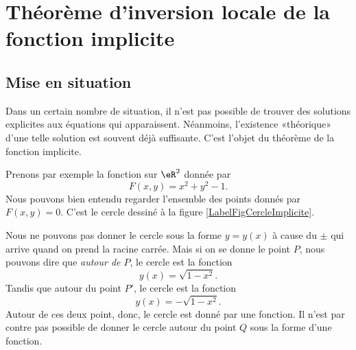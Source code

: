 					\section{Théorème d'inversion locale de la fonction implicite}

\subsection{Mise en situation}

Dans un certain nombre de situation, il n'est pas possible de trouver des solutions explicites aux équations qui apparaissent. Néanmoins, l'existence «théorique» d'une telle solution est souvent déjà suffisante. C'est l'objet du théorème de la fonction implicite.

Prenons par exemple la fonction sur $\eR^2$ donnée par 
\begin{equation}
	F(x,y)=x^2+y^2-1.
\end{equation}
Nous pouvons bien entendu regarder l'ensemble des points donnés par $F(x,y)=0$. C'est le cercle dessiné à la figure \ref{LabelFigCercleImplicite}.
\newcommand{\CaptionFigCercleImplicite}{Un cercle pour montrer l'intérêt de la fonction implicite. Si on donne \( x\), nous ne pouvons pas savoir si nous parlons de \( P\) ou de \( P'\).}


%

Nous ne pouvons pas donner le cercle sous la forme $y=y(x)$ à cause du $\pm$ qui arrive quand on prend la racine carrée. Mais si on se donne le point $P$, nous pouvons dire que \emph{autour de $P$}, le cercle est la fonction
\begin{equation}
	y(x)=\sqrt{1-x^2}.
\end{equation}
Tandis que autour du point $P'$, le cercle est la fonction
\begin{equation}
	y(x)=-\sqrt{1-x^2}.
\end{equation}
Autour de ces deux point, donc, le cercle est donné par une fonction. Il n'est par contre pas possible de donner le cercle autour du point $Q$ sous la forme d'une fonction.

